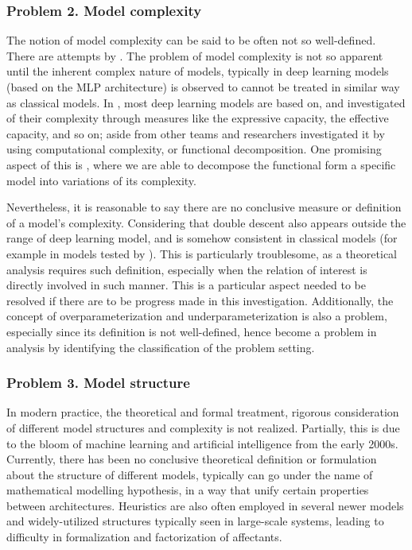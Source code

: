 \subsubsection*{Problem 2. Model complexity}
The notion of model complexity can be said to be often not so well-defined. There are attempts by \cite{hu2021modelcomplexitydeeplearning,luo2024investigatingimpactmodelcomplexity,barceló2020modelinterpretabilitylenscomputational,Molnar_2020,janik2021complexitydeepneuralnetworks}. The problem of model complexity is not so apparent until the inherent complex nature of models, typically in deep learning models (based on the MLP architecture) is observed to cannot be treated in similar way as classical models. In \cite{hu2021modelcomplexitydeeplearning}, most deep learning models are based on, and investigated of their complexity through measures like the expressive capacity, the effective capacity, and so on; aside from other teams and researchers investigated it by using computational complexity, or functional decomposition. One promising aspect of this is \cite{Molnar_2020}, where we are able to decompose the functional form a specific model into variations of its complexity. 

Nevertheless, it is reasonable to say there are no conclusive measure or definition of a model's complexity. Considering that double descent also appears outside the range of deep learning model, and is somehow consistent in classical models (for example in models tested by \cite{belkin_reconciling_2019}). This is particularly troublesome, as a theoretical analysis requires such definition, especially when the relation of interest is directly involved in such manner. This is a particular aspect needed to be resolved if there are to be progress made in this investigation. Additionally, the concept of overparameterization and underparameterization is also a problem, especially since its definition is not well-defined, hence become a problem in analysis by identifying the classification of the problem setting. 
\subsubsection*{Problem 3. Model structure}

In modern practice, the theoretical and formal treatment, rigorous consideration of different model structures and complexity is not realized. Partially, this is due to the bloom of machine learning and artificial intelligence from the early 2000s. Currently, there has been no conclusive theoretical definition or formulation about the structure of different models, typically can go under the name of mathematical modelling hypothesis, in a way that unify certain properties between architectures. Heuristics are also often employed in several newer models and widely-utilized structures typically seen in large-scale systems, leading to difficulty in formalization and factorization of affectants. 

